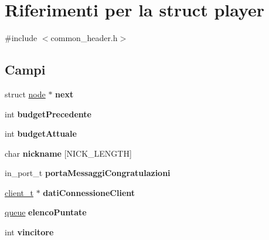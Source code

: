 \hypertarget{structplayer}{
\section{Riferimenti per la struct player}
\label{structplayer}
}


{\ttfamily \#include $<$common\_\-header.h$>$}

\subsection*{Campi}
\begin{DoxyCompactItemize}
\item 
\hypertarget{structplayer_ac2fc0874452fcd3ece3f49f4e6af86e1}{
struct \hyperlink{structnode__tag}{node} $\ast$ {\bfseries next}}
\label{structplayer_ac2fc0874452fcd3ece3f49f4e6af86e1}

\item 
\hypertarget{structplayer_a38dfd5ea1080e59383ef4411668be3b7}{
int {\bfseries budgetPrecedente}}
\label{structplayer_a38dfd5ea1080e59383ef4411668be3b7}

\item 
\hypertarget{structplayer_ae864c587a021f8709b78a9ce951ef08c}{
int {\bfseries budgetAttuale}}
\label{structplayer_ae864c587a021f8709b78a9ce951ef08c}

\item 
\hypertarget{structplayer_a5f154bd385a6d68e34cfbdecdc9ec381}{
char {\bfseries nickname} \mbox{[}NICK\_\-LENGTH\mbox{]}}
\label{structplayer_a5f154bd385a6d68e34cfbdecdc9ec381}

\item 
\hypertarget{structplayer_ad66cafc37729691af7e90f0ef142fea1}{
in\_\-port\_\-t {\bfseries portaMessaggiCongratulazioni}}
\label{structplayer_ad66cafc37729691af7e90f0ef142fea1}

\item 
\hypertarget{structplayer_a08526fd17ddb3c3366ca0efe1b4457c8}{
\hyperlink{structclient__tag}{client\_\-t} $\ast$ {\bfseries datiConnessioneClient}}
\label{structplayer_a08526fd17ddb3c3366ca0efe1b4457c8}

\item 
\hypertarget{structplayer_abcd55a6a32bf6df52be2a14ae14e82d0}{
\hyperlink{structqueue}{queue} {\bfseries elencoPuntate}}
\label{structplayer_abcd55a6a32bf6df52be2a14ae14e82d0}

\item 
\hypertarget{structplayer_aa1d1040515e9607aaa5670ce5ec9e8f2}{
int {\bfseries vincitore}}
\label{structplayer_aa1d1040515e9607aaa5670ce5ec9e8f2}

\end{DoxyCompactItemize}



